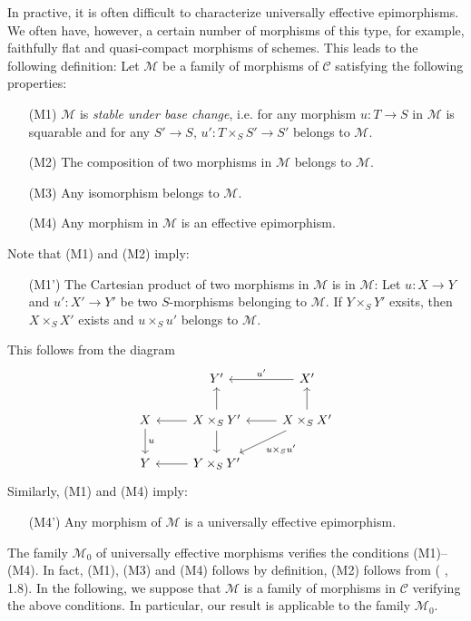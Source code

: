 In practive, it is often difficult to characterize universally effective epimorphisms. We often have, however, a certain number of morphisms of this type, for example, faithfully flat and quasi-compact morphisms of schemes. This leads to the following definition: Let $\mathcal{M}$ be a family of morphisms of $\mathcal{C}$ satisfying the following properties:
\begin{enumerate}[leftmargin=40pt]
    \item[(M1)] $\mathcal{M}$ is \textit{stable under base change}, i.e. for any morphism $u:T\to S$ in $\mathcal{M}$ is squarable and for any $S'\to S$, $u':T\times_SS'\to S'$ belongs to $\mathcal{M}$. 
    \item[(M2)] The composition of two morphisms in $\mathcal{M}$ belongs to $\mathcal{M}$.
    \item[(M3)] Any isomorphism belongs to $\mathcal{M}$.
    \item[(M4)] Any morphism in $\mathcal{M}$ is an effective epimorphism.  
\end{enumerate}
Note that (M1) and (M2) imply:
\begin{enumerate}[leftmargin=40pt]
    \item[(M1')] The Cartesian product of two morphisms in $\mathcal{M}$ is in $\mathcal{M}$: Let $u:X\to Y$ and $u':X'\to Y'$ be two $S$-morphisms belonging to $\mathcal{M}$. If $Y\times_SY'$ exsits, then $X\times_SX'$ exists and $u\times_Su'$ belongs to $\mathcal{M}$.
\end{enumerate}
This follows from the diagram
\[\begin{tikzcd}
&Y'&X'\ar[l,swap,"u'"]\\
X\ar[d,"u"]&X\times_SY'\ar[l]\ar[d]\ar[u]&X\times_SX'\ar[ld,"u\times_Su'"]\ar[l]\ar[u]\\
Y&Y\times_SY'\ar[l] 
\end{tikzcd}\]
Similarly, (M1) and (M4) imply:
\begin{enumerate}[leftmargin=40pt]
    \item[(M4')] Any morphism of $\mathcal{M}$ is a universally effective epimorphism.
\end{enumerate}

The family $\mathcal{M}_0$ of universally effective morphisms verifies the conditions (M1)--(M4). In fact, (M1), (M3) and (M4) follows by definition, (M2) follows from (\cite{SGA3} , 1.8). In the following, we suppose that $\mathcal{M}$ is a family of morphisms in $\mathcal{C}$ verifying the above conditions. In particular, our result is applicable to the family $\mathcal{M}_0$.

